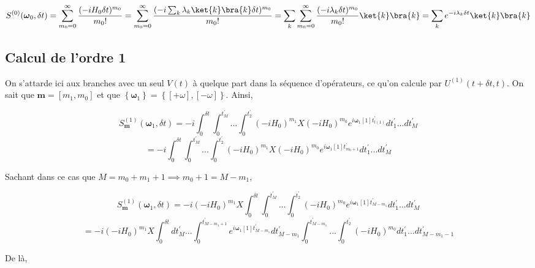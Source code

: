 \begin{equation*}
    S^{(0)}(\boldsymbol{\omega}_0, \delta t) = \sum_{m_0 = 0}^{\infty}\frac{(-iH_0\delta t)^{m_0}}{m_0!} = \sum_{m_0 = 0}^{\infty}\frac{(-i\sum_{k}\lambda_k \ket{k}\bra{k}\delta t)^{m_0}}{m_0!} = \sum_{k}\sum_{m_0 = 0}^{\infty}\frac{(-i\lambda_k\delta t)^{m_0}}{m_0!}\ket{k}\bra{k} = \sum_{k}e^{-i\lambda_k\delta t}\ket{k}\bra{k}
\end{equation*}

\subsection{Calcul de l'ordre 1}
On s'attarde ici aux branches avec un seul $V(t)$ à quelque part dans la séquence d'opérateurs, ce qu'on calcule par $ U^{(1)}(t+\delta t, t)$. On sait que $\boldsymbol{m} = [m_1, m_0]$ et que $\left\{\boldsymbol{\omega}_1\right\} = \left\{[+\omega], [-\omega]\right\}$. Ainsi, 

\begin{equation*}
    S^{(1)}_{\boldsymbol{m}}(\boldsymbol{\omega}_1, \delta t) = -i\int_{0}^{\delta t}\int_{0}^{t_M^{'}}... \int_{0}^{t_2^{'}}(-iH_0)^{m_1}X(-iH_0)^{m_0} e^{i\boldsymbol{\omega}_1[1]t^{'}_{l(1)}}dt_1^{'} ... dt_M^{'}
\end{equation*}
\begin{equation*}
    = -i\int_{0}^{\delta t}\int_{0}^{t_M^{'}}... \int_{0}^{t_2^{'}}(-iH_0)^{m_1}X(-iH_0)^{m_0} e^{i\boldsymbol{\omega}_1[1]t^{'}_{m_0+1}}dt_1^{'} ... dt_M^{'}
\end{equation*}

Sachant dans ce cas que $M = m_0 + m_1 + 1 \implies m_0 + 1 = M-m_1$,

\begin{equation*}
    S^{(1)}_{\boldsymbol{m}}(\boldsymbol{\omega}_1, \delta t) = -i (-iH_0)^{m_1}X
    \int_{0}^{\delta t}\int_{0}^{t_M^{'}}... \int_{0}^{t_2^{'}}(-iH_0)^{m_0} e^{i\boldsymbol{\omega}_1[1]t^{'}_{M-m_1}}dt_1^{'} ... dt_M^{'}
\end{equation*}
\begin{equation*}
    = -i (-iH_0)^{m_1}X
    \int_{0}^{\delta t}dt_M^{'} ... \int_{0}^{t^{'}_{M-m_1+1}}e^{i\boldsymbol{\omega}_1[1]t^{'}_{M-m_1}} dt_{M-m_1}^{'}\int_{0}^{t^{'}_{M-m_1}}... \int_{0}^{t_2^{'}}(-iH_0)^{m_0} dt_1^{'} ... dt_{M - m_1 - 1}^{'}
\end{equation*}

De là,


